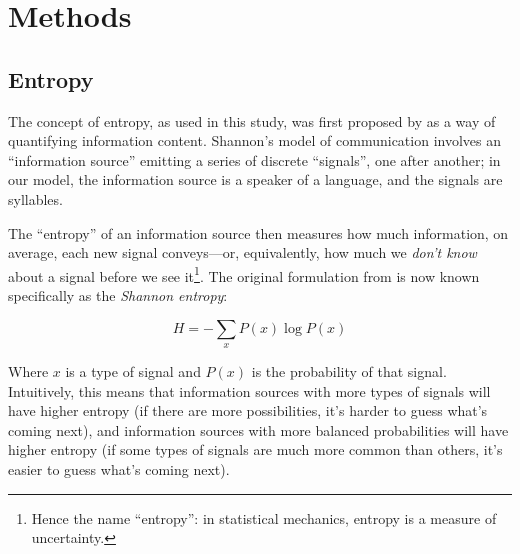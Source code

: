 \documentclass[12pt,twoside]{article}
\begin{document}



\section{Methods}
\label{sec:meth}

\subsection{Entropy}
\label{subsec:entropy}

The concept of entropy, as used in this study, was first proposed by \citet{shannon} as a way of quantifying information content. Shannon's model of communication involves an ``information source'' emitting a series of discrete ``signals'', one after another; in our model, the information source is a speaker of a language, and the signals are syllables.

The ``entropy'' of an information source then measures how much information, on average, each new signal conveys---or, equivalently, how much we \emph{don't know} about a signal before we see it\footnote{Hence the name ``entropy'': in statistical mechanics, entropy is a measure of uncertainty.}. The original formulation from \citet[50]{shannon} is now known specifically as the \emph{Shannon entropy}:

\begin{equation}
\label{eqn:shannon}
H = - \sum_x P(x) \log P(x)
\end{equation}

Where \(x\) is a type of signal and \(P(x)\) is the probability of that signal. Intuitively, this means that information sources with more types of signals will have higher entropy (if there are more possibilities, it's harder to guess what's coming next), and information sources with more balanced probabilities will have higher entropy (if some types of signals are much more common than others, it's easier to guess what's coming next).
\end{document}
